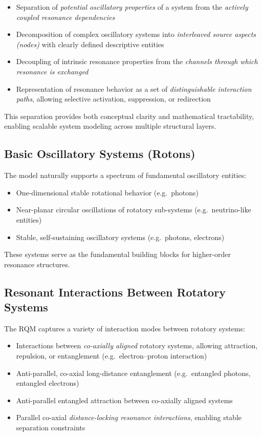 \documentclass[11pt,a4paper]{article}
\begin{document}
\begin{itemize}
  \item Separation of \emph{potential oscillatory properties} of a system from the \emph{actively coupled resonance dependencies}
  \item Decomposition of complex oscillatory systems into \emph{interleaved source aspects (nodes)} with clearly defined descriptive entities
  \item Decoupling of intrinsic resonance properties from the \emph{channels through which resonance is exchanged}
  \item Representation of resonance behavior as a set of \emph{distinguishable interaction paths}, allowing selective activation, suppression, or redirection
\end{itemize}

This separation provides both conceptual clarity and mathematical tractability, enabling scalable system modeling across multiple structural layers.

\subsection{Basic Oscillatory Systems (Rotons)}

The model naturally supports a spectrum of fundamental oscillatory entities:

\begin{itemize}
  \item One-dimensional stable rotational behavior (e.g.\ photons)
  \item Near-planar circular oscillations of rotatory sub-systems (e.g.\ neutrino-like entities)
  \item Stable, self-sustaining oscillatory systems (e.g.\ photons, electrons)
\end{itemize}

These systems serve as the fundamental building blocks for higher-order resonance structures.

\subsection{Resonant Interactions Between Rotatory Systems}

The RQM captures a variety of interaction modes between rotatory systems:

\begin{itemize}
  \item Interactions between \emph{co-axially aligned} rotatory systems, allowing attraction, repulsion, or entanglement (e.g.\ electron--proton interaction)
  \item Anti-parallel, co-axial long-distance entanglement (e.g.\ entangled photons, entangled electrons)
  \item Anti-parallel entangled attraction between co-axially aligned systems
  \item Parallel co-axial \emph{distance-locking resonance interactions}, enabling stable separation constraints
\end{itemize}
\end{document}
